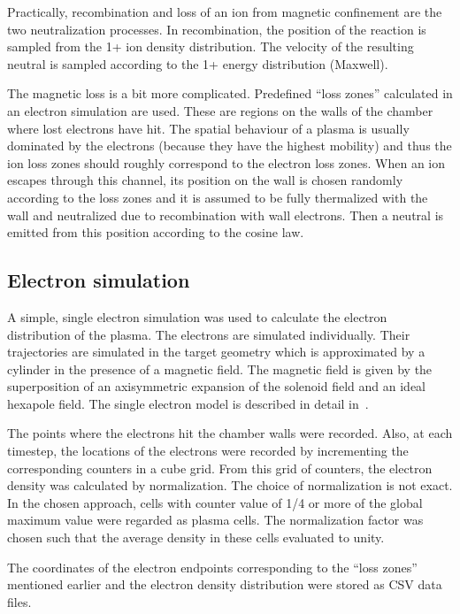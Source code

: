 \documentclass[a4paper,twoside,12pt]{article}
\begin{document}
Practically, recombination and loss of an ion from magnetic confinement are the two neutralization processes. In recombination, the position of the reaction is sampled from the 1+ ion density distribution. The velocity of the resulting neutral is sampled according to the 1+ energy distribution (Maxwell).

The magnetic loss is a bit more complicated. Predefined ``loss zones'' calculated in an electron simulation are used. These are regions on the walls of the chamber where lost electrons have hit. The spatial behaviour of a plasma is usually dominated by the electrons (because they have the highest mobility) and thus the ion loss zones should roughly correspond to the electron loss zones. When an ion escapes through this channel, its position on the wall is chosen randomly according to the loss zones and it is assumed to be fully thermalized with the wall and neutralized due to recombination with wall electrons. Then a neutral is emitted from this position according to the cosine law.

\subsection{Electron simulation}
A simple, single electron simulation was used to calculate the electron distribution of the plasma. The electrons are simulated individually. Their trajectories are simulated in the target geometry which is approximated by a cylinder in the presence of a magnetic field. The magnetic field is given by the superposition of an axisymmetric expansion of the solenoid field and an ideal hexapole field. The single electron model is described in detail in~\cite{kalvas:hiisi}.

The points where the electrons hit the chamber walls were recorded. Also, at each timestep, the locations of the electrons were recorded by incrementing the corresponding counters in a cube grid. From this grid of counters, the electron density was calculated by normalization. The choice of normalization is not exact. In the chosen approach, cells with counter value of 1/4 or more of the global maximum value were regarded as plasma cells. The normalization factor was chosen such that the average density in these cells evaluated to unity.

The coordinates of the electron endpoints corresponding to the ``loss zones'' mentioned earlier and the electron density distribution were stored as CSV data files.
\end{document}

